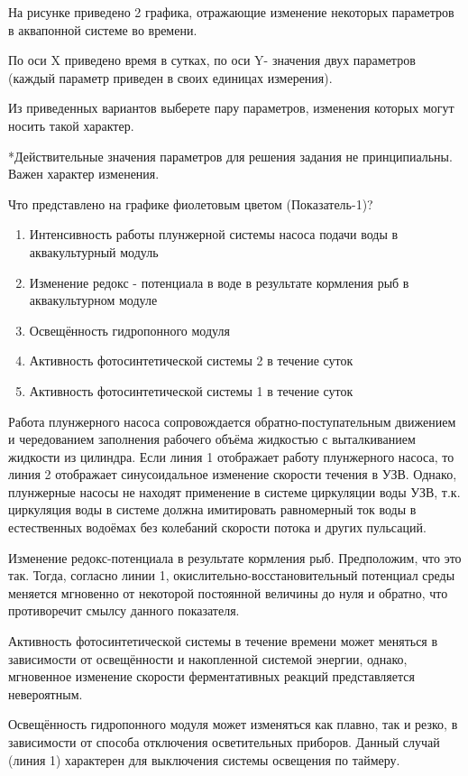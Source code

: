 
На рисунке приведено 2 графика, отражающие изменение некоторых параметров в аквапонной системе во времени.

По оси X приведено время в сутках, по оси Y- значения двух параметров (каждый параметр приведен в своих единицах измерения). 

Из приведенных вариантов выберете пару параметров, изменения которых могут носить такой характер.


*Действительные значения параметров для решения задания не принципиальны. Важен характер изменения.

Что представлено на графике фиолетовым цветом (Показатель-1)?

\begin{enumerate}
    \item Интенсивность работы плунжерной системы насоса подачи воды в аквакультурный модуль
    \item Изменение редокс - потенциала в воде в результате кормления рыб в аквакультурном модуле
    \item Освещённость гидропонного модуля
    \item Активность фотосинтетической системы 2 в течение суток
    \item Активность фотосинтетической системы 1 в течение суток
\end{enumerate}

\explanationSection

Работа плунжерного насоса сопровождается обратно-поступательным движением и чередованием заполнения рабочего объёма жидкостью с выталкиванием жидкости из цилиндра. Если линия 1 отображает работу плунжерного насоса, то линия 2 отображает синусоидальное изменение скорости течения в УЗВ. Однако, плунжерные насосы не находят применение в системе циркуляции воды УЗВ, т.к. циркуляция воды в системе должна имитировать равномерный ток воды в естественных водоёмах без колебаний скорости потока и других пульсаций.

Изменение редокс-потенциала в результате кормления рыб. Предположим, что это так. Тогда, согласно линии 1, окислительно-восстановительный потенциал среды меняется мгновенно от некоторой постоянной величины до нуля и обратно, что противоречит смылсу данного показателя.

Активность фотосинтетической системы в течение времени может меняться в зависимости от освещённости и накопленной системой энергии, однако, мгновенное изменение скорости ферментативных реакций представляется невероятным.

Освещённость гидропонного модуля может изменяться как плавно, так и резко, в зависимости от способа отключения осветительных приборов. Данный случай (линия 1) характерен для выключения системы освещения по таймеру.

